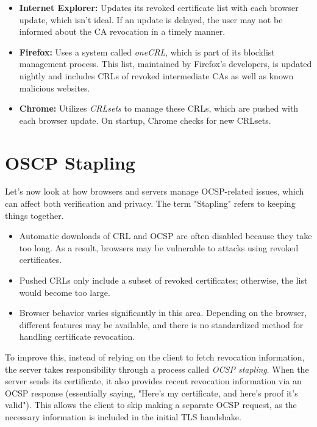 \begin{itemize}
    \item \textbf{Internet Explorer:} Updates its revoked certificate
      list with each browser update, which isn’t ideal. If an update
      is delayed, the user may not be informed about the CA revocation
      in a timely manner.
  
    \item \textbf{Firefox:} Uses a system called \textit{oneCRL},
      which is part of its blocklist management process. This list,
      maintained by Firefox’s developers, is updated nightly and
      includes CRLs of revoked intermediate CAs as well as known
      malicious websites.
  
    \item \textbf{Chrome:} Utilizes \textit{CRLsets} to manage these
      CRLs, which are pushed with each browser update. On startup,
      Chrome checks for new CRLsets.
\end{itemize}

\section{OSCP Stapling}

Let's now look at how browsers and servers manage OCSP-related issues,
which can affect both verification and privacy. The term "Stapling"
refers to keeping things together.

\begin{itemize}
    \item Automatic downloads of CRL and OCSP are often disabled
      because they take too long. As a result, browsers may be
      vulnerable to attacks using revoked certificates.
  
    \item Pushed CRLs only include a subset of revoked certificates;
      otherwise, the list would become too large.
  
    \item Browser behavior varies significantly in this area.
      Depending on the browser, different features may be available,
      and there is no standardized method for handling certificate
      revocation.
\end{itemize}

To improve this, instead of relying on the client to fetch revocation
information, the server takes responsibility through a process called
\textit{OCSP stapling}. When the server sends its certificate, it also
provides recent revocation information via an OCSP response
(essentially saying, "Here’s my certificate, and here’s proof it’s
valid"). This allows the client to skip making a separate OCSP
request, as the necessary information is included in the initial TLS
handshake.\\

